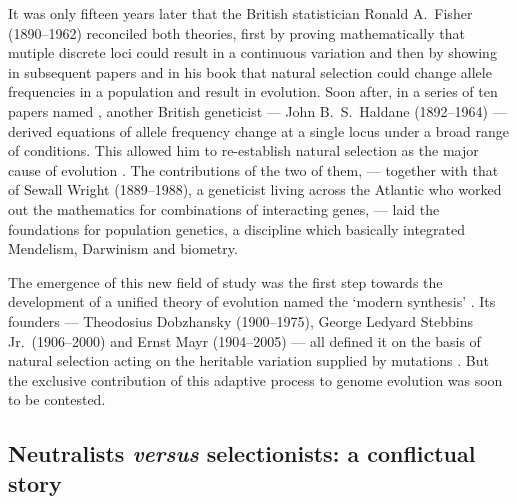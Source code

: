 It was only fifteen years later that the British statistician Ronald A.\ Fisher (1890--1962) reconciled both theories, first by proving mathematically that mutiple discrete loci could result in a continuous variation \citep{fisher1919xv} and then by showing in subsequent papers and in his book \textit{} \citeyearpar{fisher1930genetical} that natural selection could change allele frequencies in a population and result in evolution.
Soon after, in a series of ten papers named \textit{} \citeyearpar{haldane1927mathematical}, another British geneticist — John B.\ S.\ Haldane (1892--1964) — derived equations of allele frequency change at a single locus under a broad range of conditions.
This allowed him to re-establish natural selection as the major cause of evolution \citep{haldane1932causes}.
The contributions of the two of them, — together with that of Sewall Wright (1889--1988), a geneticist living across the Atlantic who worked out the mathematics for combinations of interacting genes, — laid the foundations for population genetics, a discipline which basically integrated Mendelism, Darwinism and biometry.

The emergence of this new field of study was the first step towards the development of a unified theory of evolution named the ‘modern synthesis’ \citep{huxley1942evolution}. 
Its founders — Theodosius Dobzhansky (1900--1975), George Ledyard Stebbins Jr.\ (1906--2000) and Ernst Mayr (1904--2005) — all defined it on the basis of natural selection acting on the heritable variation supplied by mutations \citep{mayr1959where,stebbins1966processes,dobzhansky1974chance}.
But the exclusive contribution of this adaptive process to genome evolution was soon to be contested.


\subsection{Neutralists \textit{versus} selectionists: a conflictual story}

